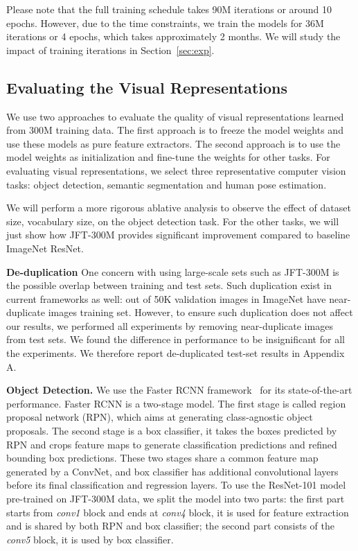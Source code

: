 \documentclass[10pt,twocolumn,letterpaper]{article}
\begin{document}
Please note that the full training schedule takes 90M iterations or around 10 epochs. However, due to the time constraints, we train the models for 36M iterations or 4 epochs, which takes approximately 2 months. We will study the impact of training iterations in Section~\ref{sec:exp}.

\subsection{Evaluating the Visual Representations}
We use two approaches to evaluate the quality of visual representations learned from 300M training data. The first approach is to freeze the model weights and use these models as pure feature extractors. The second approach is to use the model weights as initialization and fine-tune the weights for other tasks. For evaluating visual representations, we select three representative computer vision tasks: object detection, semantic segmentation and human pose estimation.

We will perform a more rigorous ablative analysis to observe the effect of dataset size, vocabulary size, \etc on the object detection task. For the other tasks, we will just show how JFT-300M provides significant improvement compared to baseline ImageNet ResNet.\vspace{0.1in}

\noindent\textbf{De-duplication} One concern with using large-scale sets such as JFT-300M is the possible overlap between training and test sets. Such duplication exist in current frameworks as well:  out of 50K validation images in ImageNet have  near-duplicate images training set. 
However, to ensure such duplication does not affect our results, we performed all experiments by removing near-duplicate images from test sets. We found the difference in performance to be insignificant for all the experiments. We therefore report de-duplicated test-set results in Appendix A.




\noindent\textbf{Object Detection.} We use the Faster RCNN framework~\cite{FasterRCNN} for its state-of-the-art performance. Faster RCNN is a two-stage model. The first stage is called region proposal network (RPN), which aims at generating class-agnostic object proposals. The second stage is a box classifier, it takes the boxes predicted by RPN and crops feature maps to generate classification predictions and refined bounding box predictions. These two stages share a common feature map generated by a ConvNet, and box classifier has additional convolutional layers before its final classification and regression layers. To use the ResNet-101 model pre-trained on JFT-300M data, we split the model into two parts: the first part starts from \textit{conv1} block and ends at \textit{conv4} block, it is used for feature extraction and is shared by both RPN and box classifier; the second part consists of the \textit{conv5} block, it is used by box classifier.\vspace{0.01in} 
\end{document}
